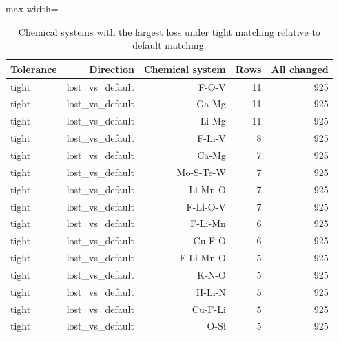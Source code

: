 \begin{table}[H]
\centering
\sitablefont
\caption{Chemical systems with the largest loss under tight matching relative to default matching.}
\label{tab:v3-match-chem}
\begin{adjustbox}{max width=\linewidth}
\begin{tabular}{@{}lrrrr@{}}
\toprule
Tolerance & Direction & Chemical system & Rows & All changed \\
\midrule
tight & lost\_vs\_default & F-O-V & 11 & 925 \\
tight & lost\_vs\_default & Ga-Mg & 11 & 925 \\
tight & lost\_vs\_default & Li-Mg & 11 & 925 \\
tight & lost\_vs\_default & F-Li-V & 8 & 925 \\
tight & lost\_vs\_default & Ca-Mg & 7 & 925 \\
tight & lost\_vs\_default & Mo-S-Te-W & 7 & 925 \\
tight & lost\_vs\_default & Li-Mn-O & 7 & 925 \\
tight & lost\_vs\_default & F-Li-O-V & 7 & 925 \\
tight & lost\_vs\_default & F-Li-Mn & 6 & 925 \\
tight & lost\_vs\_default & Cu-F-O & 6 & 925 \\
tight & lost\_vs\_default & F-Li-Mn-O & 5 & 925 \\
tight & lost\_vs\_default & K-N-O & 5 & 925 \\
tight & lost\_vs\_default & H-Li-N & 5 & 925 \\
tight & lost\_vs\_default & Cu-F-Li & 5 & 925 \\
tight & lost\_vs\_default & O-Si & 5 & 925 \\
\bottomrule
\end{tabular}
\end{adjustbox}
\end{table}


